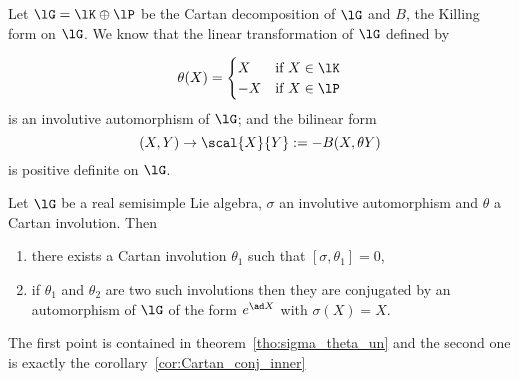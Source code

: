 Let $\lG=\lK\oplus\lP$ be the Cartan decomposition of $\lG$ and $B$, the Killing form on $\lG$. We know that the linear transformation of $\lG$ defined by

\[
 \theta(X)=\begin{cases}
             X & \text{if }X\in\lK\\
	     -X& \text{if }X\in\lP
           \end{cases}
\]
 is an involutive automorphism of $\lG$; and the bilinear form
\[
  (X,Y)\to\scal{X}{Y}:=-B(X,\theta Y)
\]
is positive definite on $\lG$.

\begin{theorem}
Let $\lG$ be a real semisimple Lie algebra, $\sigma$ an involutive automorphism and $\theta$ a Cartan involution. Then

\begin{enumerate}
\item there exists a Cartan involution $\theta_1$ such that $[\sigma,\theta_1]=0$,
\item if $\theta_1$ and $\theta_2$ are two such involutions then they are conjugated by an automorphism of $\lG$ of the form $e^{\ad X}$ with $\sigma(X)=X$.
\end{enumerate}
\label{tho:sigma_theta}
\end{theorem}

The first point is contained in theorem~\ref{tho:sigma_theta_un} and the second one is exactly the corollary~\ref{cor:Cartan_conj_inner}



